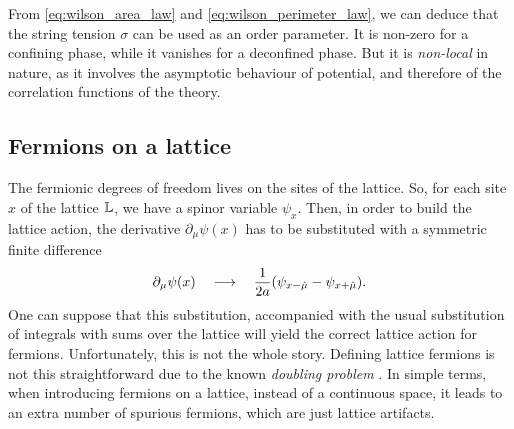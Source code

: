 From \eqref{eq:wilson_area_law} and \eqref{eq:wilson_perimeter_law}, we can deduce that the string tension $\sigma$ can be used as an order parameter.
It is non-zero for a confining phase, while it vanishes for a deconfined phase.
But it is \emph{non-local} in nature, as it involves the asymptotic behaviour of potential, and therefore of the correlation functions of the theory.

\begin{figure}[t]
\end{figure}



\subsection{Fermions on a lattice}
\label{sub:fermions_on_a_lattice}

The fermionic degrees of freedom lives on the sites of the lattice.
So, for each site $x$ of the lattice $\mathbb{L}$, we have a spinor variable $\psi_x$.
Then, in order to build the lattice action, the derivative $\partial_{\mu} \psi(x)$ has to be substituted with a symmetric finite difference
\begin{equation*}
    \partial_{\mu} \psi(x)
    \quad \longrightarrow \quad
    \frac{1}{2 a} \qty( \psi_{x - \hat{\mu}} - \psi_{x + \hat{\mu}}).
\end{equation*}
One can suppose that this substitution, accompanied with the usual substitution of integrals with sums over the lattice will yield the correct lattice action for fermions.
Unfortunately, this is not the whole story.
Defining lattice fermions is not this straightforward due to the known \emph{doubling problem} \cite{nielsen1981fermions, susskind1977fermions}.
In simple terms, when introducing fermions on a lattice, instead of a continuous space, it leads to an extra number of spurious fermions, which are just lattice artifacts.

